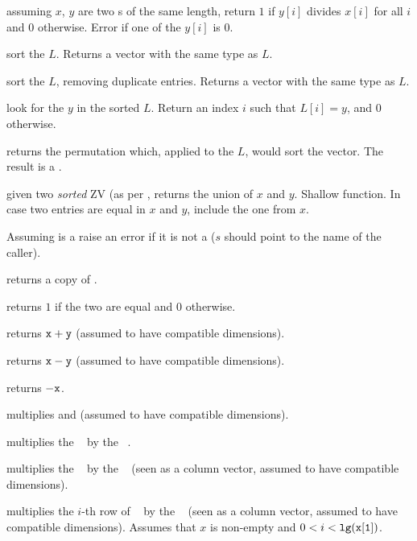  assuming $x$, $y$ are two s of the same
length, return $1$ if $y[i]$ divides $x[i]$ for all $i$ and $0$ otherwise.
Error if one of the $y[i]$ is $0$.

 sort the  $L$.
Returns a vector with the same type as $L$.

 sort the  $L$, removing duplicate
entries. Returns a vector with the same type as $L$.

 look for the  $y$ in the sorted
 $L$. Return an index $i$ such that $L[i] = y$, and  $0$ otherwise.

 returns the permutation which, applied to the
 $L$, would sort the vector. The result is a .

 given two \emph{sorted} ZV (as per
, returns the union of $x$ and $y$. Shallow function. In case two
entries are equal in $x$ and $y$,  include the one from $x$.


 Assuming  is a 
raise an error if it is not a  ($s$ should point to the name of the
caller).

 returns a copy of .

 returns $1$ if the two  are equal
and $0$ otherwise.

 returns ${\tt x} + {\tt y}$ (assumed to have
compatible dimensions).

 returns ${\tt x} - {\tt y}$ (assumed to have
compatible dimensions).

 returns $-{\tt x}$.

 multiplies  and  (assumed to
have compatible dimensions).

 multiplies the ~
by the ~.

 multiplies the ~
by the ~ (seen as a column vector, assumed to have compatible
dimensions).

 multiplies the $i$-th row
of ~ by the ~ (seen as a column vector, assumed
to have compatible dimensions). Assumes that $x$ is non-empty and
$0 < i < {\tt lg(x[1])}$.

